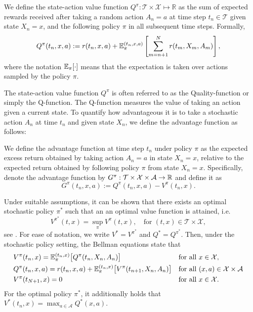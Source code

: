 \begin{definition}
\label{def: State-action value function}
    We define the state-action value function $Q^\pi: \mathcal T \times \mathcal X \mapsto \mathbb R$ as the sum of expected rewards received after taking a random action $A_n=a$ at time step $t_n \in \mathcal T$ given state $X_n=x$, and the following policy $\pi$ in all subsequent time steps. Formally,
    \begin{equation*}
        Q^\pi(t_n,x,a) := r(t_n, x,a) + \mathbb{E}^{(t_n,x,a)}_\pi\left[\sum_{m=n+1}^N r(t_m, X_m, A_m)\right],
    \end{equation*}
    where the notation $\mathbb{E}_\pi[\cdot]$ means that the expectation is taken over actions sampled by the policy $\pi$. 
\end{definition}

The state-action value function $Q^\pi$ is often referred to as the Quality-function or simply the Q-function. The Q-function measures the value of taking an action given a current state. To quantify how advantageous it is to take a stochastic action $A_n$ at time $t_n$ and given state $X_n$, we define the advantage function as follows:

\begin{definition}
\label{def: Advantage function}
    We define the advantage function at time step $t_n$ under policy $\pi$ as the expected excess return obtained by taking action $A_n=a$ in state $X_n=x$, relative to the expected return obtained by following policy $\pi$ from state $X_n=x$. Specifically, denote the advantage function by $G^\pi: \mathcal{T}\times \mathcal{X} \times \mathcal{A} \rightarrow \mathbb{R}$ and define it as
    \begin{equation*}
        G^\pi(t_n,x,a) := Q^\pi(t_n,x,a) - V^\pi(t_n,x).
    \end{equation*}
\end{definition}

Under suitable assumptions, it can be shown that there exists an optimal stochastic policy $\pi^*$ such that an an optimal value function is attained, i.e.
\begin{equation*}
    V^{\pi^{*}}(t,x) = \sup_{\pi} V^\pi(t, x), \quad \text{for } (t,x) \in \mathcal{T} \times \mathcal{X},
\end{equation*}
see \cite{blackwell1965discounted,maitra1968discounted,furukawa1972markovian, schael1975conditions,bertsekasShreve1978}. For ease of notation, we write $V^* = V^{\pi^{*}}$ and $Q^* = Q^{\pi^{*}}$. Then, under the stochastic policy setting, the Bellman equations state that 
\begin{align}
    & V^\pi(t_n,x) = \mathbb{E}^{(t_n,x)}_\pi\big[Q^\pi(t_n,X_n,A_n)\big] && \text{for all } x \in \mathcal X, \nonumber \\
    & Q^\pi(t_n,x,a) = r(t_n,x,a) + \mathbb{E}^{(t_n,x)}_\pi\big[V^\pi(t_{n+1},X_n,A_n)\big] && \text{for all } (x,a) \in \mathcal X \times \mathcal A \label{eqn: Bellman equations}\\
    & V^\pi(t_{N+1},x) = 0 && \text{for all } x \in \mathcal X. \nonumber
\end{align}
For the optimal policy $\pi^*$, it additionally holds that $V^*(t_n,x) = \max_{a \in \mathcal{A}}Q^*(x,a)$. 

